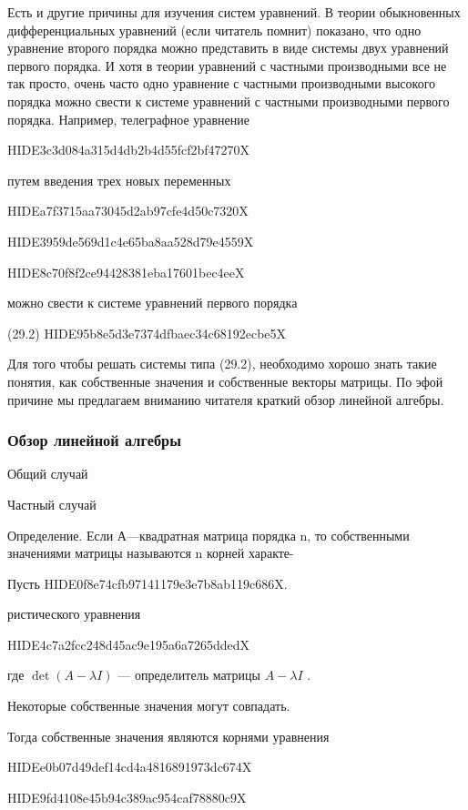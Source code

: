\documentclass[
  ukrainian,
]{article}
\begin{document}
Есть и другие причины для изучения систем уравнений. В теории
обыкновенных дифференциальных уравнений (если читатель помнит) показано,
что одно уравнение второго порядка можно представить в виде системы двух
уравнений первого порядка. И хотя в теории уравнений с частными
производными все не так просто, очень часто одно уравнение с частными
производными высокого порядка можно свести к системе уравнений с
частными производными первого порядка. Например, телеграфное уравнение

HIDE3c3d084a315d4db2b4d55fcf2bf47270X

путем введения трех новых переменных

HIDEa7f3715aa73045d2ab97cfe4d50c7320X

HIDE3959de569d1c4e65ba8aa528d79e4559X

HIDE8c70f8f2ce94428381eba17601bec4eeX

можно свести к системе уравнений первого порядка

(29.2) HIDE95b8e5d3e7374dfbaec34c68192ecbe5X

Для того чтобы решать системы типа (29.2), необходимо хорошо знать такие
понятия, как собственные значения и собственные векторы матрицы. По эфой
причине мы предлагаем вниманию читателя краткий обзор линейной алгебры.

\subsubsection{Обзор линейной
алгебры}\label{ux43eux431ux437ux43eux440-ux43bux438ux43dux435ux439ux43dux43eux439-ux430ux43bux433ux435ux431ux440ux44b}

Общий случай

Частный случай

Определение. Если А---квадратная матрица порядка n, то собственными
значениями матрицы называются n корней характе-

Пусть HIDE0f8e74cfb97141179e3e7b8ab119c686X.

ристического уравнения

HIDE4c7a2fcc248d45ac9e195a6a7265ddedX

где \(\det(A-\lambda I)\) --- определитель матрицы \(A-\lambda I\) .

Некоторые собственные значения могут совпадать.

Тогда собственные значения являются корнями уравнения

HIDEe0b07d49def14cd4a4816891973dc674X

HIDE9fd4108e45b94c389ac954caf78880c9X
\end{document}
